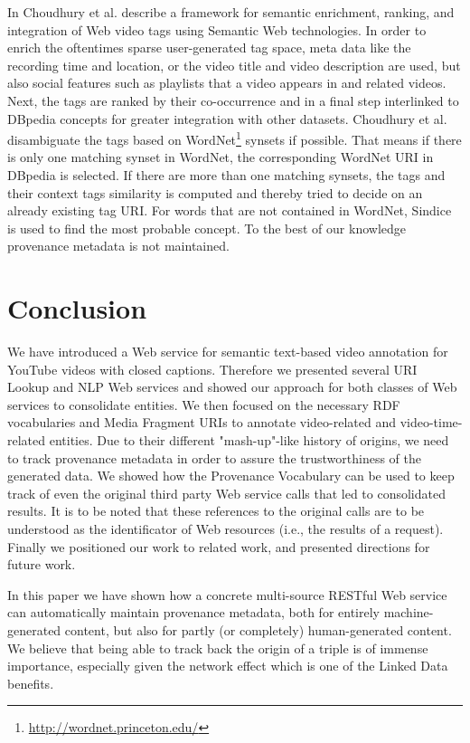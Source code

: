 \documentclass{acm_proc_article-sp}
\begin{document}
In \cite{Choudhury:YouTube} Choudhury et al. describe a framework for semantic enrichment, ranking, and integration of Web video tags using Semantic Web technologies. In order to enrich the oftentimes sparse user-generated tag space, meta data like the recording time and location, or the video title and video description are used, but also social features such as playlists that a video appears in and related videos. Next, the tags are ranked by their co-occurrence and in a final step interlinked to DBpedia concepts for greater integration with other datasets. Choudhury et al. disambiguate the tags based on WordNet\footnote{\url{http://wordnet.princeton.edu/}} synsets if possible. That means if there is only one matching synset in WordNet, the corresponding WordNet URI in DBpedia is selected. If there are more than one matching synsets, the tags and their context tags similarity is computed and thereby tried to decide on an already existing tag URI. For words that are not contained in WordNet, Sindice is used to find the most probable concept. To the best of our knowledge provenance metadata is not maintained.

\section{Conclusion}\label{sec:conclusion}
We have introduced a Web service for semantic text-based video annotation for YouTube videos with closed captions. Therefore we presented several URI Lookup and NLP Web services and showed our approach for both classes of Web services to consolidate entities. We then focused on the necessary RDF vocabularies and Media Fragment URIs to annotate video-related and video-time-related entities. Due to their different "mash-up"-like history of origins, we need to track provenance metadata in order to assure the trustworthiness of the generated data. We showed how the Provenance Vocabulary can be used to keep track of even the original third party Web service calls that led to consolidated results. It is to be noted that these references to the original calls are to be understood as the identificator of Web resources (i.e., the results of a request). Finally we positioned our work to related work, and presented directions for future work.

In this paper we have shown how a concrete multi-source RESTful Web service can automatically maintain provenance metadata, both for entirely machine-generated content, but also for partly (or completely) human-generated content. We believe that being able to track back the origin of a triple is of immense importance, especially given the network effect which is one of the Linked Data benefits.
\end{document}
